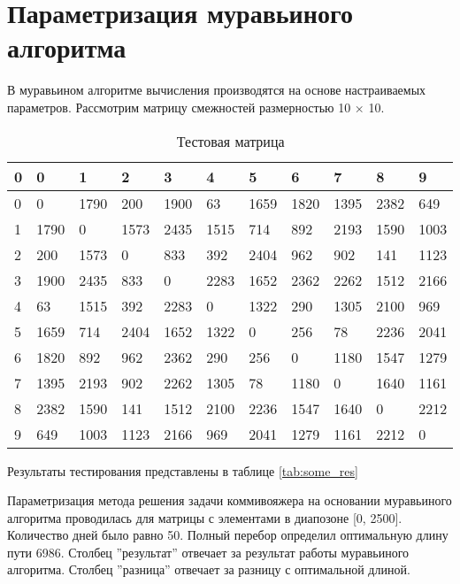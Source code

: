 
\section{Параметризация муравьиного алгоритма}\label{comparepart}

В муравьином алгоритме вычисления производятся на основе настраиваемых параметров.
Рассмотрим матрицу смежностей размерностью 10 × 10.

\begin{table}[ht]
    \caption{Тестовая матрица}
    \centering
\begin{tabular}{ l | l  l  l  l  l  l  l  l  l l}
    0 & 0 & 1 & 2 & 3 & 4 & 5 & 6 & 7 & 8 & 9 \\ \hline
    0 & 0 & 1790 & 200 & 1900 & 63 & 1659 & 1820 & 1395 & 2382 & 649 \\
    1 & 1790 & 0 & 1573 & 2435 & 1515 & 714 & 892 & 2193 & 1590 & 1003 \\
    2 & 200 & 1573 & 0 & 833 & 392 & 2404 & 962 & 902 & 141 & 1123 \\
    3 & 1900 & 2435 & 833 & 0 & 2283 & 1652 & 2362 & 2262 & 1512 & 2166 \\
    4 & 63 & 1515 & 392 & 2283 & 0 & 1322 & 290 & 1305 & 2100 & 969 \\
    5 & 1659 & 714 & 2404 & 1652 & 1322 & 0 & 256 & 78 & 2236 & 2041 \\ 
    6 & 1820 & 892 & 962 & 2362 & 290 & 256 & 0 & 1180 & 1547 & 1279 \\ 
    7 & 1395 & 2193 & 902 & 2262 & 1305 & 78 & 1180 & 0 & 1640 & 1161 \\
    8 & 2382 & 1590 & 141 & 1512 & 2100 & 2236 & 1547 & 1640 & 0 & 2212 \\
    9 & 649 & 1003 & 1123 & 2166 & 969 & 2041 & 1279 & 1161 & 2212 & 0 \\
\end{tabular}
\label{tab:test_matrix}
\end{table}


Результаты тестирования представлены в таблице \ref{tab:some_res}

Параметризация метода решения задачи коммивояжера на основании
муравьиного алгоритма проводилась для матрицы с элементами в диапозоне
[0, 2500]. Количество дней было равно 50. Полный перебор определил оптимальную длину пути 6986. 
Столбец ”результат” отвечает за результат работы
муравьиного алгоритма. Столбец ”разница” отвечает за разницу с оптимальной длиной.


